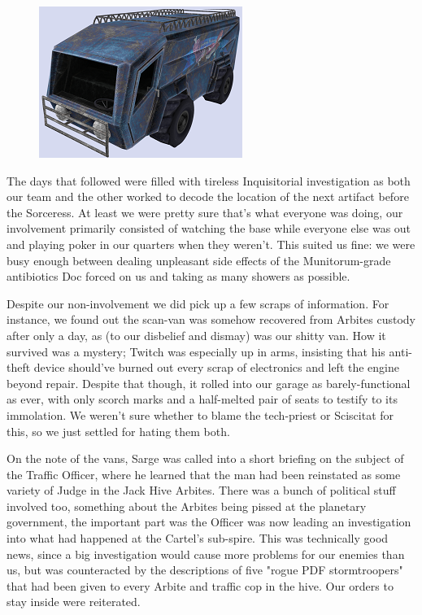 \begin{figure}
	\begin{center}
		\includegraphics[width=\figwidth]{pics/18/44.png}
	\end{center}
\end{figure}
The days that followed were filled with tireless Inquisitorial investigation as both our team and the other worked to decode the location of the next artifact before the Sorceress. 
At least we were pretty sure that's what everyone was doing, our involvement primarily consisted of watching the base while everyone else was out and playing poker in our quarters when they weren't. 
This suited us fine: 
we were busy enough between dealing unpleasant side effects of the Munitorum-grade antibiotics Doc forced on us and taking as many showers as possible.

Despite our non-involvement we did pick up a few scraps of information. 
For instance, we found out the scan-van was somehow recovered from Arbites custody after only a day, as (to our disbelief and dismay) was our shitty van. 
How it survived was a mystery; 
Twitch was especially up in arms, insisting that his anti-theft device should've burned out every scrap of electronics and left the engine beyond repair. 
Despite that though, it rolled into our garage as barely-functional as ever, with only scorch marks and a half-melted pair of seats to testify to its immolation. 
We weren't sure whether to blame the tech-priest or Sciscitat for this, so we just settled for hating them both. 


On the note of the vans, Sarge was called into a short briefing on the subject of the Traffic Officer, where he learned that the man had been reinstated as some variety of Judge in the Jack Hive Arbites. 
There was a bunch of political stuff involved too, something about the Arbites being pissed at the planetary government, the important part was the Officer was now leading an investigation into what had happened at the Cartel's sub-spire. 
This was technically good news, since a big investigation would cause more problems for our enemies than us, but was counteracted by the descriptions of five "rogue PDF stormtroopers" that had been given to every Arbite and traffic cop in the hive. 
Our orders to stay inside were reiterated.

